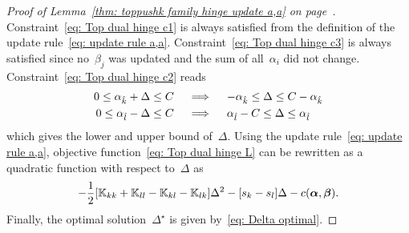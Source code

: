 \topruleaa*
\begin{proof}[Proof of Lemma~\ref{thm: toppushk family hinge update a,a} on page~\pageref{thm: toppushk family hinge update a,a}]
  Constraint~\eqref{eq: Top dual hinge c1} is always satisfied from the definition of the update rule~\eqref{eq: update rule a,a}. Constraint~\eqref{eq: Top dual hinge c3} is always satisfied since no~$\beta_j$ was updated and the sum of all~$\alpha_i$ did not change. Constraint~\eqref{eq: Top dual hinge c2} reads
  \begin{align*}
    0 \leq \alpha_{\hat{k}} + \Delta \leq C
    & \quad \implies \quad
    - \alpha_{\hat{k}} \leq \Delta \leq C - \alpha_{\hat{k}} \\
    0 \leq \alpha_{\hat{l}} - \Delta \leq C
    & \quad \implies \quad
    \alpha_{\hat{l}} - C \leq \Delta \leq \alpha_{\hat{l}}
  \end{align*}
  which gives the lower and upper bound of~$\Delta.$ Using the update rule~\eqref{eq: update rule a,a}, objective function~\eqref{eq: Top dual hinge L} can be rewritten as a quadratic function with respect to~$\Delta$ as
  \begin{equation*}
    - \frac{1}{2} \Brac[s]{\K_{kk} + \K_{ll} - \K_{kl} - \K_{lk}} \Delta^2
    - \Brac[s]{s_k - s_l} \Delta
    - c(\bm{\alpha}, \bm{\beta}).
  \end{equation*}
  Finally, the optimal solution~$\Delta^{\star}$ is given by~\eqref{eq: Delta optimal}.
\end{proof}

